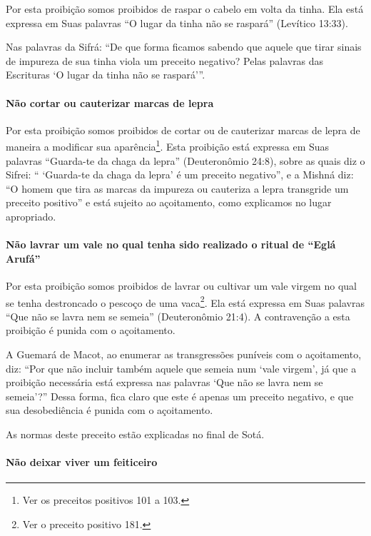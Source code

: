 Por esta proibição somos proibidos de raspar o cabelo em volta da tinha.
Ela está expressa em Suas palavras ``O lugar da tinha não se raspará''
(Levítico 13:33).

Nas palavras da Sifrá: ``De que forma ficamos sabendo que aquele que
tirar sinais de impureza de sua tinha viola um preceito negativo? Pelas
palavras das Escrituras `O lugar da tinha não se raspará'''.

\paragraph{Não cortar ou cauterizar marcas de lepra}

Por esta proibição somos proibidos de cortar ou de cauterizar marcas de lepra de maneira a modificar sua aparência\footnote{Ver os preceitos positivos 101 a 103.}.
Esta proibição está expressa em Suas palavras ``Guarda-te da chaga da
lepra'' (Deuteronômio 24:8), sobre as quais diz o Sifrei: `` `Guarda-te
da chaga da lepra' é um preceito negativo'', e a Mishná diz: ``O homem
que tira as marcas da impureza ou cauteriza a lepra transgride um
preceito positivo'' e está sujeito ao açoitamento, como explicamos no
lugar apropriado.

\paragraph{Não lavrar um vale no qual tenha sido realizado o ritual de ``Eglá Arufá''}

Por esta proibição somos proibidos de lavrar ou cultivar um vale virgem
no qual se tenha destroncado o pescoço de uma
vaca\footnote{Ver o preceito positivo 181.}. Ela está expressa em Suas palavras ``Que
não se lavra nem se semeia'' (Deuteronômio 21:4). A contravenção a esta
proibição é punida com o açoitamento.

A Guemará de Macot, ao enumerar as transgressões puníveis com o
açoitamento, diz: ``Por que não incluir também aquele que semeia num
`vale virgem', já que a proibição necessária está expressa nas palavras
`Que não se lavra nem se semeia'?'' Dessa forma, fica claro que este é
apenas um preceito negativo, e que sua desobediência é punida com o
açoitamento.

As normas deste preceito estão explicadas no final de Sotá.

\paragraph{Não deixar viver um feiticeiro}

